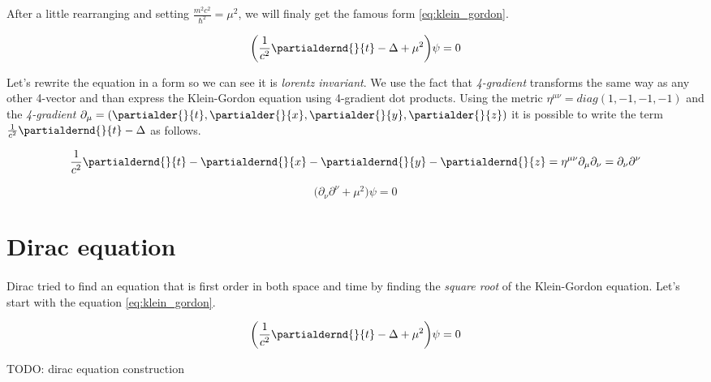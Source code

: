 After a little rearranging and setting $\frac{m^{2} c^{2}}{\hbar^{2}} = \mu^{2}$, we will finaly get the famous form \ref{eq:klein_gordon}.

\begin{equation}
    \label{eq:klein_gordon}
    \bigg(\frac{1}{c^{2}} \partialdernd{}{t} - \Delta + \mu^{2} \bigg) \psi = 0
\end{equation}

Let's rewrite the equation in a form so we can see it is \textit{lorentz invariant}. We use the fact that \textit{4-gradient}
transforms the same way as any other 4-vector and than express the Klein-Gordon equation using 4-gradient dot products.
Using the metric $\eta^{\mu \nu} = diag(1, -1, -1, -1)$ and the \textit{4-gradient} $\partial_{\mu} = (\partialder{}{t}, \partialder{}{x}, \partialder{}{y}, \partialder{}{z})$ 
it is possible to write the term $\frac{1}{c^{2}} \partialdernd{}{t} - \Delta$ as follows.

\begin{equation*}
     \frac{1}{c^{2}} \partialdernd{}{t} - \partialdernd{}{x} - \partialdernd{}{y} - \partialdernd{}{z} = \eta^{\mu \nu} \partial_{\mu} \partial_{\nu} = \partial_{\nu} \partial^{\nu}
\end{equation*}

\begin{equation}
    \bigg(\partial_{\nu} \partial^{\nu} + \mu^{2} \bigg) \psi = 0
\end{equation}

\section{Dirac equation}

\paragraph{} Dirac tried to find an equation that is first order in both space and time by finding the \textit{square root} 
of the Klein-Gordon equation. Let's start with the equation 
\ref{eq:klein_gordon}.

\begin{equation*}
    \bigg(\frac{1}{c^{2}} \partialdernd{}{t} - \Delta + \mu^{2} \bigg) \psi = 0
\end{equation*}

TODO: dirac equation construction
